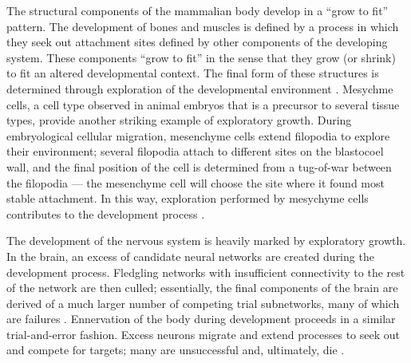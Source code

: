 The structural components of the mammalian body develop in a ``grow to fit'' pattern. The development of bones and muscles is defined by a process in which they seek out attachment sites defined by other components of the developing system. These components ``grow to fit'' in the sense that they grow (or shrink) to fit an altered developmental context. The final form of these structures is determined through exploration of the developmental environment \cite[pg 214]{Downing2015IntelligenceSystems}. Mesychme cells, a cell type observed in animal embryos that is a precursor to several tissue types, provide another striking example of exploratory growth. During embryological cellular migration, mesenchyme cells extend filopodia to explore their environment; several filopodia attach to different sites on the blastocoel wall, and the final position of the cell is determined from a tug-of-war between the filopodia --- the mesenchyme cell will choose the site where it found most stable attachment. In this way, exploration performed by mesychyme cells contributes to the development process \cite[pg 214]{Downing2015IntelligenceSystems}.

The development of the nervous system is heavily marked by exploratory growth. In the brain, an excess of candidate neural networks are created during the development process. Fledgling networks with insufficient connectivity to the rest of the network are then culled; essentially, the final components of the brain are derived of a much larger number of competing trial subnetworks, many of which are failures \cite[p 214]{Downing2015IntelligenceSystems}. Ennervation of the body during development proceeds in a similar trial-and-error fashion. Excess neurons migrate and extend processes to seek out and compete for targets; many are unsuccessful and, ultimately, die \cite{Edelman2001DegeneracySystems}. 

